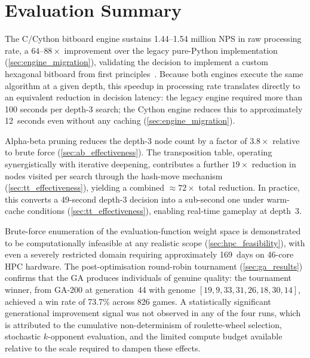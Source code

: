 \section{Evaluation Summary}
\label{sec:ch4_summary}

The C/Cython bitboard engine sustains 1.44--1.54 million NPS in raw processing rate,
a $64$--$88\times$ improvement over the legacy pure-Python implementation
(\cref{sec:engine_migration}), validating the decision to implement a custom hexagonal
bitboard from first principles~\cite{browne2014bitboards}. Because both engines execute
the same algorithm at a given depth, this speedup in processing rate translates directly
to an equivalent reduction in decision latency: the legacy engine required more than
100 seconds per depth-3 search; the Cython engine reduces this to approximately
12~seconds even without any caching (\cref{sec:engine_migration}).

Alpha-beta pruning reduces the depth-3 node count by a factor of $3.8\times$ relative
to brute force (\cref{sec:ab_effectiveness}). The transposition table, operating
synergistically with iterative deepening, contributes a further $19\times$ reduction
in nodes visited per search through the hash-move mechanism (\cref{sec:tt_effectiveness}),
yielding a combined ${\approx}72\times$ total reduction. In practice, this converts a
49-second depth-3 decision into a sub-second one under warm-cache conditions
(\cref{sec:tt_effectiveness}), enabling real-time gameplay at depth~3.

Brute-force enumeration of the evaluation-function weight space is demonstrated to be
computationally infeasible at any realistic scope (\cref{sec:hpc_feasibility}), with even a
severely restricted domain requiring approximately 169~days on 46-core HPC hardware.
The post-optimisation round-robin tournament (\cref{sec:ga_results}) confirms that the GA
produces individuals of genuine quality: the tournament winner, from GA-200 at generation~44
with genome $[19, 9, 33, 31, 26, 18, 30, 14]$, achieved a win rate of 73.7\% across
826 games. A statistically significant generational improvement signal was not observed
in any of the four runs, which is attributed to the cumulative non-determinism of
roulette-wheel selection, stochastic $k$-opponent evaluation, and the limited compute
budget available relative to the scale required to dampen these effects.